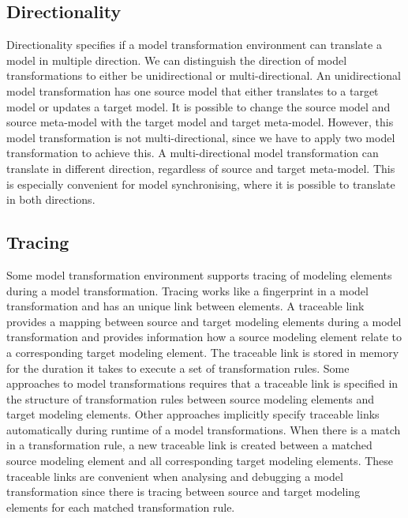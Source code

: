 \subsection{Directionality}

Directionality specifies if a model transformation environment can translate a
model in multiple direction. We can distinguish the direction of model
transformations to either be unidirectional or multi-directional. An
unidirectional model transformation has one source model that either translates
to a target model or updates a target model. It is possible to change the source
model and source meta-model with the target model and target meta-model.
However, this model transformation is not multi-directional, since we have to apply two
model transformation to achieve this. A multi-directional model transformation
can translate in different direction, regardless of source and target
meta-model. This is especially convenient for model synchronising, where it is
possible to translate in both directions. 

\subsection{Tracing}
\label{sec:tracing}

Some model transformation environment supports tracing of modeling
elements during a model transformation. Tracing works like a fingerprint in a
model transformation and has an unique link between elements. A traceable link
provides a mapping between source and target modeling elements during a model
transformation and provides information how a source modeling element relate
to a corresponding target modeling element. The traceable link is stored in
memory for the duration it takes to execute a set of transformation rules. Some
approaches to model transformations requires that a traceable link is
specified in the structure of transformation rules between source modeling
elements and target modeling elements. Other approaches implicitly specify
traceable links automatically during runtime of a model transformations. When
there is a match in a transformation rule, a new traceable link is created
between a matched source modeling element and all corresponding target modeling
elements. These traceable links are convenient when analysing and debugging
a model transformation since there is tracing between source and target
modeling elements for each matched transformation rule.

